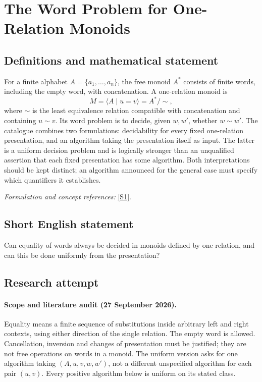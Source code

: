 \documentclass[11pt]{article}
\begin{document}
\section*{\texorpdfstring{The Word Problem for One-Relation Monoids}{The Word Problem for One-Relation Monoids}}\label{30006883}
\subsection{Definitions and mathematical statement}
For a finite alphabet $A=\{a_1,\ldots,a_n\}$, the free monoid $A^*$ consists of finite words, including the empty word, with concatenation. A one-relation monoid is
\[
 M=\langle A\mid u=v\rangle=A^*/{\sim},
\]
where $\sim$ is the least equivalence relation compatible with concatenation and containing $u\sim v$. Its word problem is to decide, given $w,w'$, whether $w\sim w'$. The catalogue combines two formulations: decidability for every fixed one-relation presentation, and an algorithm taking the presentation itself as input. The latter is a uniform decision problem and is logically stronger than an unqualified assertion that each fixed presentation has some algorithm. Both interpretations should be kept distinct; an algorithm announced for the general case must specify which quantifiers it establishes.
\par\smallskip\textit{Formulation and concept references:} \href{https://arxiv.org/abs/2105.02853}{[S1]}.

\subsection{Short English statement}
Can equality of words always be decided in monoids defined by one relation, and can this be done uniformly from the presentation?
\subsection{Research attempt}
\paragraph{Scope and literature audit (27 September 2026).}
Equality means a finite sequence of substitutions inside arbitrary left
and right contexts, using either direction of the single relation.
The empty word is allowed. Cancellation, inversion and changes of
presentation must be justified; they are not free operations on words
in a monoid. The uniform version asks for one algorithm taking
$(A,u,v,w,w')$, not a different unspecified algorithm for each pair
$(u,v)$. Every positive algorithm below is uniform on its stated class.
\end{document}
